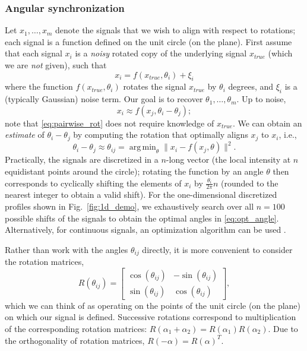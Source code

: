 \documentclass[10pt,twocolumn]{article}
\DeclareMathOperator*{\argmin}{arg\,min}
\newcommand{\fig}[0]{Fig.}
\begin{document}
\subsubsection*{Angular synchronization \citep{singer2011angular}}

Let $ x_1, \dots, x_m$ denote the signals that we wish to align with respect to rotations;
each signal is a function defined on the unit circle (on the plane).
%
First assume that each signal $x_i$ is a {\it noisy} rotated copy of the underlying signal $x_{true}$
(which we are {\it not} given), such that
\begin{equation}
x_i = f(x_{true}, \theta_i) + \xi_i
\end{equation}
where the function $f(x_{true}, \theta_i)$ rotates the signal $x_{true}$ by $\theta_i$ degrees, and $\xi_i$ is a (typically Gaussian) noise term.
%
Our goal is to recover $\theta_1, \dots, \theta_m$.
%
Up to noise,
\begin{equation} \label{eq:pairwise_rot}
x_i \approx f(x_j, \theta_i - \theta_j) ;
\end{equation}
note that \eqref{eq:pairwise_rot} does not require knowledge of $x_{true}$.
%
We can obtain an {\it estimate} of $\theta_i - \theta_j$ by computing the rotation that optimally aligns $x_j$ to $x_i$,
i.e., %
%
\begin{equation} \label{eq:opt_angle}
\theta_i - \theta_j \approx \theta_{ij} = \argmin_{\theta} \|x_i - f(x_j, \theta)\|^2.
\end{equation}
%
Practically, the signals are discretized in a $n$-long vector (the local intensity at $n$ equidistant points around the circle);
rotating the function by an angle $\theta$ then corresponds to cyclically shifting the elements of $x_i$
by $\frac{\theta_i}{2 \pi} n$ (rounded to the nearest integer to obtain a valid shift).
%
For the one-dimensional discretized profiles shown in \fig~\ref{fig:1d_demo}, we exhaustively search over all $n=100$ possible shifts of the signals to obtain the optimal angles in \eqref{eq:opt_angle}.
%
Alternatively, for continuous signals, an optimization algorithm
can be used \citep{ahuja2007template}.

Rather than work with the angles $\theta_{ij}$ directly, it is more convenient to consider the rotation matrices,
\begin{equation} \label{eq:R_theta}
R(\theta_{ij}) = \begin{bmatrix}
\cos(\theta_{ij}) & -\sin(\theta_{ij}) \\
\sin(\theta_{ij}) & \cos(\theta_{ij})
\end{bmatrix},
\end{equation}
which we can think of as operating on the points of the unit circle (on the plane) on which our signal is defined.
%
Successive rotations correspond to multiplication of the corresponding rotation matrices: $R(\alpha_1 + \alpha_2) = R(\alpha_1) R(\alpha_2)$.
%
Due to the orthogonality of rotation matrices, $R(-\alpha) = R(\alpha)^T$.
\end{document}

